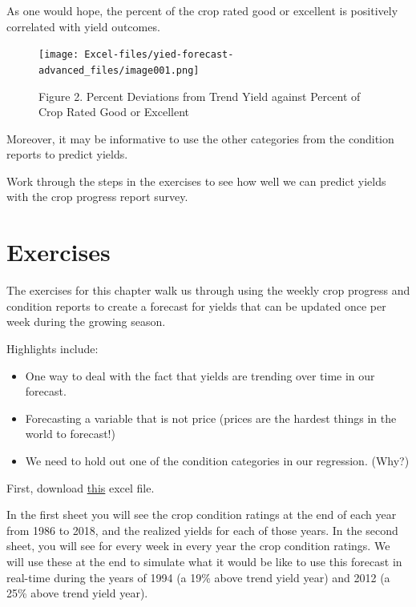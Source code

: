 \documentclass[
  letterpaper,
  DIV=11,
  numbers=noendperiod]{scrreprt}
\providecommand{\tightlist}{%
  \setlength{\itemsep}{0pt}\setlength{\parskip}{0pt}}\usepackage{longtable,booktabs,array}
\begin{document}
As one would hope, the percent of the crop rated good or excellent is
positively correlated with yield outcomes.

\begin{figure}

{\centering \texttt{[image: Excel-files/yied-forecast-advanced\_files/image001.png]}

}

\caption{Figure 2. Percent Deviations from Trend Yield against Percent
of Crop Rated Good or Excellent}

\end{figure}

Moreover, it may be informative to use the other categories from the
condition reports to predict yields.

Work through the steps in the exercises to see how well we can predict
yields with the crop progress report survey.

\hypertarget{exercises-9}{%
\section{Exercises}\label{exercises-9}}

The exercises for this chapter walk us through using the weekly crop
progress and condition reports to create a forecast for yields that can
be updated once per week during the growing season.

Highlights include:

\begin{itemize}
\tightlist
\item
  One way to deal with the fact that yields are trending over time in
  our forecast.
\item
  Forecasting a variable that is not price (prices are the hardest
  things in the world to forecast!)
\item
  We need to hold out one of the condition categories in our regression.
  (Why?)
\end{itemize}

First, download \href{Excel-files/yied-forecast-advanced.xlsx}{this}
excel file.

In the first sheet you will see the crop condition ratings at the end of
each year from 1986 to 2018, and the realized yields for each of those
years. In the second sheet, you will see for every week in every year
the crop condition ratings. We will use these at the end to simulate
what it would be like to use this forecast in real-time during the years
of 1994 (a 19\% above trend yield year) and 2012 (a 25\% above trend
yield year).
\end{document}
